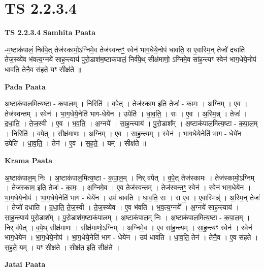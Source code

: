 \documentclass[17pt]{extarticle}
\begin{document}
\section{ TS 2.2.3.4 }

\textbf{TS 2.2.3.4 } \newline
\textbf{Samhita Paata} \newline

-म॒ष्टाक॑पालं॒ निर्व॑पे॒त् तेज॑स्कामो॒ऽग्निमे॒व तेज॑स्वन्तꣳ॒॒ स्वेन॑ भाग॒धेये॒नोप॑ धावति॒ स ए॒वास्मि॒न् तेजो॑ दधाति तेज॒स्व्ये॑व भ॑वत्य॒ग्नये॑ साह॒न्त्याय॑ पुरो॒डाश॑म॒ष्टाक॑पालं॒ निर्व॑पे॒थ् सीक्ष॑माणो॒ ऽग्निमे॒व सा॑ह॒न्त्यꣳ स्वेन॑ भाग॒धेये॒नोप॑ धावति॒ तेनै॒व स॑हते॒ यꣳ सीक्ष॑ते ॥ \newline

\textbf{Pada Paata} \newline

अ॒ष्टाक॑पाल॒मित्य॒ष्टा - क॒पा॒ल॒म् । निरिति॑ । व॒पे॒त् । तेज॑स्काम॒ इति॒ तेजः॑ - का॒मः॒ । अ॒ग्निम् । ए॒व । तेज॑स्वन्तम् । स्वेन॑ । भा॒ग॒धेये॒नेति॑ भाग-धेये॑न । उपेति॑ । धा॒व॒ति॒ । सः । ए॒व । अ॒स्मि॒न्न् । तेजः॑ । द॒धा॒ति॒ । ते॒ज॒स्वी । ए॒व । भ॒व॒ति॒ । अ॒ग्नये᳚ । सा॒ह॒न्त्याय॑ । पु॒रो॒डाश᳚म् । अ॒ष्टाक॑पाल॒मित्य॒ष्टा - क॒पा॒ल॒म् । निरिति॑ । व॒पे॒त् । सीक्ष॑माणः । अ॒ग्निम् । ए॒व । सा॒ह॒न्त्यम् । स्वेन॑ । भा॒ग॒धेये॒नेति॑ भाग - धेये॑न । उपेति॑ । धा॒व॒ति॒ । तेन॑ । ए॒व । स॒ह॒ते॒ । यम् । सीक्ष॑ते ॥  \newline


\textbf{Krama Paata} \newline

अ॒ष्टाक॑पाल॒म् निः । अ॒ष्टाक॑पाल॒मित्य॒ष्टा - क॒पा॒ल॒म् । निर् व॑पेत् । व॒पे॒त् तेज॑स्कामः । तेज॑स्कामो॒ऽग्निम् । तेज॑स्काम॒ इति॒ तेजः॑ - का॒मः॒ । अ॒ग्निमे॒व । ए॒व तेज॑स्वन्तम् । तेज॑स्वन्तꣳ॒॒ स्वेन॑ । स्वेन॑ भाग॒धेये॑न । भा॒ग॒धेये॒नोप॑ । भा॒ग॒धेये॒नेति॑ भाग - धेये॑न । उप॑ धावति । धा॒व॒ति॒ सः । स ए॒व । ए॒वास्मिन्न्॑ । अ॒स्मि॒न् तेजः॑ । तेजो॑ दधाति । द॒धा॒ति॒ ते॒ज॒स्वी । ते॒ज॒स्व्ये॑व । ए॒व भ॑वति । भ॒व॒त्य॒ग्नये᳚ । अ॒ग्नये॑ साह॒न्त्याय॑ । सा॒ह॒न्त्याय॑ पुरो॒डाश᳚म् । पु॒रो॒डाश॑म॒ष्टाक॑पालम् । अ॒ष्टाक॑पाल॒म् निः । अ॒ष्टाक॑पाल॒मित्य॒ष्टा - क॒पा॒ल॒म् । निर् व॑पेत् । व॒पे॒थ् सीक्ष॑माणः । सीक्ष॑माणो॒ऽग्निम् । अ॒ग्निमे॒व । ए॒व सा॑ह॒न्त्यम् । सा॒ह॒न्त्यꣳ स्वेन॑ । स्वेन॑ भाग॒धेये॑न । भा॒ग॒धेये॒नोप॑ । भा॒ग॒धेये॒नेति॑ भाग - धेये॑न । उप॑ धावति । धा॒व॒ति॒ तेन॑ । तेनै॒व । ए॒व स॑हते । स॒ह॒ते॒ यम् । यꣳ सीक्ष॑ते । सीक्ष॑त॒ इति॒ सीक्ष॑ते । \newline

\textbf{Jatai Paata} \newline
\end{document}
